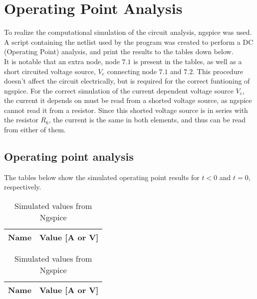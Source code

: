 \section{Operating Point Analysis}
\label{sec:simulation}

To realize the computational simulation of the circuit analysis, ngspice was used. A script containing the netlist used by the program was created to perform a DC (Operating Point) analysis, and print the results to the tables down below.\\ 
It is notable that an extra node, node $7.1$ is present in the tables, as well as a short circuited voltage source, $V_{e}$ connecting node $7.1$ and $7.2$. This procedure doesn't affect the circuit electrically, but is required for the correct funtioning of ngspice. For the correct simulation of the current dependent voltage source $V_{c}$, the current it depends on must be read from a shorted voltage source, as ngspice cannot read it from a resistor. Since this shorted voltage source is in series with the resistor $R_{6}$, the current is the same in both elements, and thus can be read from either of them.\\ 

\subsection{Operating point analysis} 

The tables below show the simulated operating point results for $t<0$ and $t=0$, respectively. 

\FloatBarrier
\begin{table}[h]
  \centering
  \begin{tabular}{|l|r|}
    \hline    
    {\bf Name} & {\bf Value [A or V]} \\ \hline
    
  \end{tabular}
  \caption{Simulated values from Ngspice}
  \label{tab:op}
\end{table}
\FloatBarrier

\FloatBarrier
\begin{table}[h]
  \centering
  \begin{tabular}{|l|r|}
    \hline    
    {\bf Name} & {\bf Value [A or V]} \\ \hline
    
  \end{tabular}
  \caption{Simulated values from Ngspice}
  \label{tab:op}
\end{table}
\FloatBarrier


